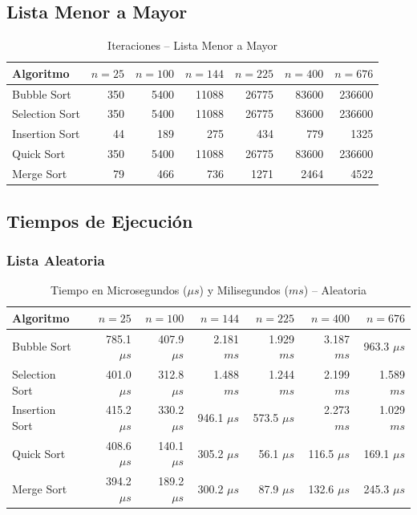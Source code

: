 \documentclass[12pt]{article}
\begin{document}
\subsection*{Lista Menor a Mayor}

\begin{table}[H]
\centering
\caption{Iteraciones -- Lista Menor a Mayor}
\begin{tabular}{lrrrrrr}
\toprule
\textbf{Algoritmo} & \textbf{$n=25$} & \textbf{$n=100$} & \textbf{$n=144$} & \textbf{$n=225$} & \textbf{$n=400$} & \textbf{$n=676$} \\
\midrule
Bubble Sort    & 350  & 5400  & 11088 & 26775 & 83600  & 236600 \\
Selection Sort & 350  & 5400  & 11088 & 26775 & 83600  & 236600 \\
Insertion Sort & 44   & 189   & 275   & 434   & 779    & 1325   \\
Quick Sort     & 350  & 5400  & 11088 & 26775 & 83600  & 236600 \\
Merge Sort     & 79   & 466   & 736   & 1271  & 2464   & 4522   \\
\bottomrule
\end{tabular}
\end{table}
\subsection*{Tiempos de Ejecución}
\subsubsection*{Lista Aleatoria}
\begin{table}[H]
\centering
\caption{Tiempo en Microsegundos ($\mu s$) y Milisegundos ($ms$) -- Aleatoria}
\begin{tabular}{lrrrrrr}
\toprule
\textbf{Algoritmo} & \textbf{$n=25$} & \textbf{$n=100$} & \textbf{$n=144$} & \textbf{$n=225$} & \textbf{$n=400$} & \textbf{$n=676$} \\
\midrule
Bubble Sort    & 785.1 $\mu s$ & 407.9 $\mu s$ & 2.181 $ms$ & 1.929 $ms$ & 3.187 $ms$ & 963.3 $\mu s$ \\
Selection Sort & 401.0 $\mu s$ & 312.8 $\mu s$ & 1.488 $ms$ & 1.244 $ms$ & 2.199 $ms$ & 1.589 $ms$    \\
Insertion Sort & 415.2 $\mu s$ & 330.2 $\mu s$ & 946.1 $\mu s$ & 573.5 $\mu s$ & 2.273 $ms$ & 1.029 $ms$ \\
Quick Sort     & 408.6 $\mu s$ & 140.1 $\mu s$ & 305.2 $\mu s$ & 56.1 $\mu s$  & 116.5 $\mu s$ & 169.1 $\mu s$ \\
Merge Sort     & 394.2 $\mu s$ & 189.2 $\mu s$ & 300.2 $\mu s$ & 87.9 $\mu s$  & 132.6 $\mu s$ & 245.3 $\mu s$ \\
\bottomrule
\end{tabular}
\end{table}
\end{document}
